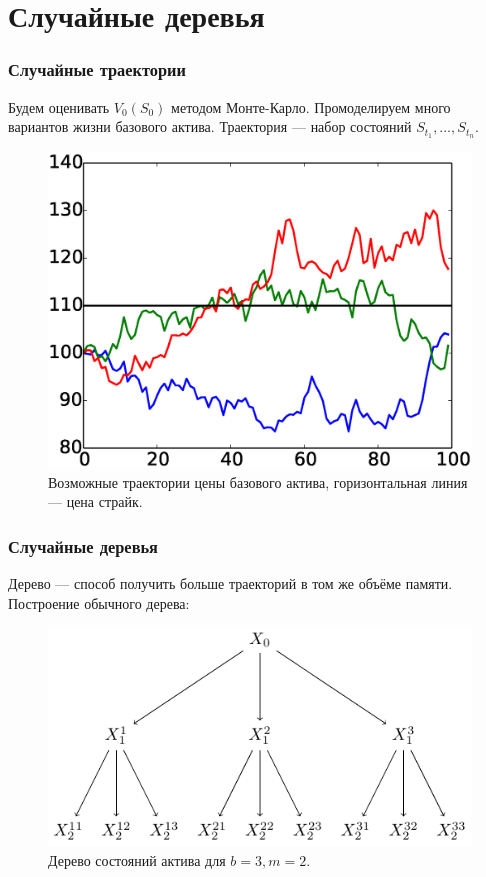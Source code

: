 \documentclass[unicode, notheorems]{beamer}
\begin{document}
\section{Случайные деревья}
    \begin{frame}
        \frametitle{Случайные траектории}
        Будем оценивать $V_0(S_0)$ методом Монте-Карло.
        Промоделируем много вариантов жизни базового актива. Траектория --- набор состояний $S_{t_1}, \ldots, S_{t_n}$.
        \begin{figure}[h]
            \includegraphics[height=0.5\paperheight]{traces}
            \caption{Возможные траектории цены базового актива, горизонтальная линия --- цена страйк.}
            \label{fig:traces}
        \end{figure}
    \end{frame}

\begin{frame}
    \frametitle{Случайные деревья}
    Дерево --- способ получить больше траекторий в том же объёме памяти. Построение обычного дерева:
    \begin{figure}
    \centering
    \includegraphics[width=\textwidth]{exponential_tree}
    \caption{Дерево состояний актива для $b = 3, m = 2$.}
    \label{fig:exponential_tree}
    \end{figure}
\end{frame}
\end{document}
